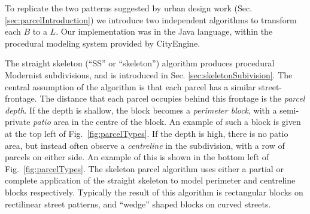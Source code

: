 To replicate the two patterns suggested by urban design work (Sec. \ref{sec:parcelIntroduction}) we introduce two independent algorithms to transform each $B$ to a $L$. Our implementation was in the Java language, within the procedural modeling system provided by CityEngine\cite{cityEngine}.

The straight skeleton (``SS'' or ``skeleton'') algorithm produces procedural Modernist subdivisions, and is introduced in Sec. \ref{sec:skeletonSubivision}. The central assumption of the algorithm is that each parcel has a similar street-frontage. The distance that each parcel occupies behind this frontage is the \emph{parcel depth}. If the depth is shallow, the block becomes a \emph{perimeter block}, with a semi-private \emph{patio} area in the centre of the block. An example of such a block is given at the top left of Fig.~\ref{fig:parcelTypes}. If the depth is high, there is no patio area, but instead often observe a \emph{centreline} in the subdivision, with a row of parcels on either side. An example of this is shown in the bottom left of Fig.~\ref{fig:parcelTypes}. The skeleton parcel algorithm uses either a partial or complete application of the straight skeleton to model perimeter and centreline blocks respectively. Typically the result of this algorithm is rectangular blocks on rectilinear street patterns, and ``wedge'' shaped blocks on curved streets.

\begin{comment}
The OBB algorithm is detailed in Sec.\ref{sec:obbSubdivision}, and creates a block subdivision in the traditional style. An adaptive recursive partitioning of the block is used, as introduced by Parish and M\"{u}ller\cite{Parish:2001:PMC}. Because of this street access is not guaranteed, but controlled by the user via a parameter. Further parameters control the distribution of width and area of the generated parcels. The parcels generated are commonly of a rectangular shape, and may exhibit greater diversity in size that those from the skeleton subdivision algorithm.

It is possible to combine both subdivision styles within one block by creating a perimeter block with the skeleton algorithm and then using the OBB algorithm to partition the central patio region.
\end{comment}



